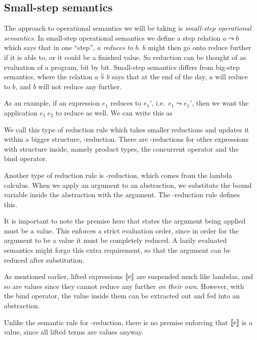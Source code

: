 \subsection{Small-step semantics}
The approach to operational semantics we will be taking is
\emph{small-step operational semantics}. In small-step operational
semantics we define a step relation $a \leadsto b$ which says that in one
``step'', $a$ \textit{reduces to} $b$. $b$ might then go onto reduce
further if it is able to, or it could be a finished value. So
reduction can be thought of as evaluation of a program, bit by
bit. Small-step semantics differs from big-step semantics, where the
relation $a \Downarrow b$ says that at the end of the day, $a$ will reduce to
$b$, and $b$ will not reduce any further.

As an example, if an expression $e_1$ reduces to $e_1'$, i.e.\ $e_1 \leadsto
e_1'$, then we want the application $e_1 \ e_2$ to reduce
as well. We can write this as
\begin{mathpar}
\end{mathpar}

We call this type of reduction rule which takes smaller reductions and
updates it within a bigger structure, \xi-reduction. There are
\xi-reductions for other expressions with structure inside, namely
product types, the concurrent operator and the bind operator.

Another type of reduction rule is \beta-reduction, which comes from the
lambda calculus. When we apply an argument to an abstraction, we
substitute the bound variable inside the abstraction with the
argument. The \beta-reduction rule defines this.
\begin{mathpar}
\end{mathpar}

It is important to note the premise here that states the argument
being applied must be a value. This enforces a strict evaluation
order, since in order for the argument to be a value it must be
completely reduced. A lazily evaluated semantics might forgo this
extra requirement, so that the argument can be reduced after
substitution.

As mentioned earlier, lifted expressions $\lift{e}$ are suspended much
like lambdas, and so are values since they cannot reduce any
further \emph{on their own}. However, with the bind operator, the
value inside them can be extracted out and fed into an abstraction.
\begin{mathpar}
\end{mathpar}
Unlike the semantic rule for \beta-reduction, there is no premise
enforcing that $\lift{e}$ is a value, since all lifted terms are
values anyway.

